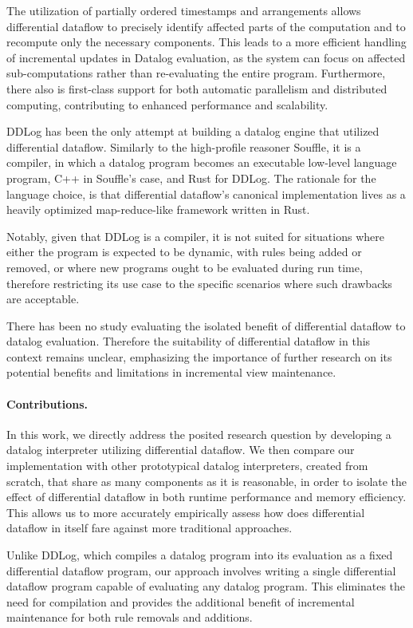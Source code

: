 \documentclass[sigconf,screen,review,natbib]{acmart}
\theoremstyle{definition}
\begin{document}
The utilization of partially ordered timestamps and arrangements allows differential dataflow to precisely
identify affected parts of the computation and to recompute only the necessary components. This leads to
a more efficient handling of incremental updates in Datalog evaluation, as the system can focus on affected
sub-computations rather than re-evaluating the entire program. Furthermore, there also is first-class support
for both automatic parallelism and distributed computing, contributing to enhanced performance and scalability.

DDLog\cite{ddlog} has been the only attempt at building a datalog engine that utilized differential dataflow.
Similarly to the high-profile reasoner Souffle\cite{souffle}, it is a compiler, in which a datalog program
becomes an executable low-level language program, C++ in Souffle's case, and Rust for DDLog. The rationale for
the language choice, is that differential dataflow's canonical implementation lives as a heavily optimized
map-reduce-like framework written in Rust.

Notably, given that DDLog is a compiler, it is not suited for situations where either the program is expected
to be dynamic, with rules being added or removed, or where new programs ought to be evaluated during run
time, therefore restricting its use case to the specific scenarios where such drawbacks are acceptable.

There has been no study evaluating the isolated benefit of differential dataflow to datalog evaluation. Therefore
the suitability of differential dataflow in this context remains unclear, emphasizing the importance of further
research on its potential benefits and limitations in incremental view maintenance.
\paragraph{Contributions.} In this work, we directly address the posited research question by developing a datalog
interpreter utilizing differential dataflow. We then compare our implementation with other prototypical datalog
interpreters, created from scratch, that share as many components as it is reasonable, in order to isolate
the effect of differential dataflow in both runtime performance and memory efficiency. This allows us to more
accurately empirically assess how does differential dataflow in itself fare against more traditional approaches.

Unlike DDLog, which compiles a datalog program into its evaluation as a fixed differential dataflow program, our
approach involves writing a single differential dataflow program capable of evaluating any datalog program. This
eliminates the need for compilation and provides the additional benefit of incremental maintenance for both rule
removals and additions.
\end{document}
